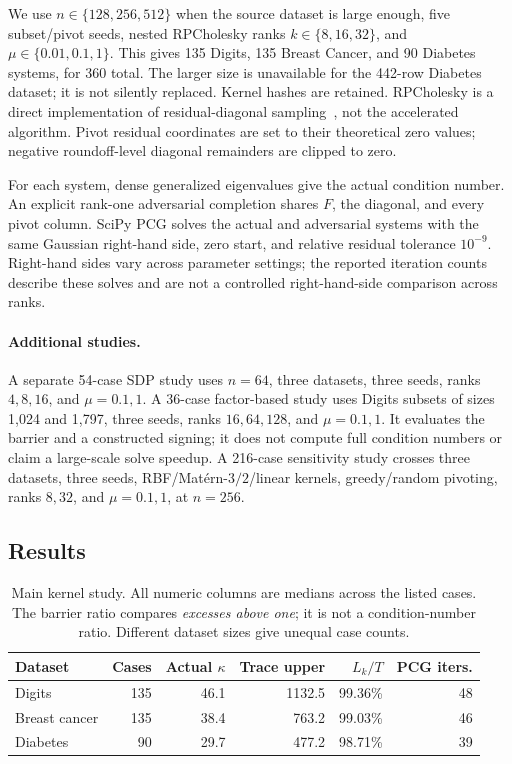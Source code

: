 \documentclass[11pt]{article}
\theoremstyle{definition}\newtheorem{definition}[theorem]{Definition}
\begin{document}
We use $n\in\{128,256,512\}$ when the source dataset is large enough, five subset/pivot seeds, nested RPCholesky ranks $k\in\{8,16,32\}$, and $\mu\in\{0.01,0.1,1\}$. This gives 135 Digits, 135 Breast Cancer, and 90 Diabetes systems, for 360 total. The larger size is unavailable for the 442-row Diabetes dataset; it is not silently replaced. Kernel hashes are retained. RPCholesky is a direct implementation of residual-diagonal sampling~\cite{chen}, not the accelerated algorithm. Pivot residual coordinates are set to their theoretical zero values; negative roundoff-level diagonal remainders are clipped to zero.

For each system, dense generalized eigenvalues give the actual condition number. An explicit rank-one adversarial completion shares $F$, the diagonal, and every pivot column. SciPy PCG solves the actual and adversarial systems with the same Gaussian right-hand side, zero start, and relative residual tolerance $10^{-9}$. Right-hand sides vary across parameter settings; the reported iteration counts describe these solves and are not a controlled right-hand-side comparison across ranks.

\paragraph{Additional studies.}
A separate 54-case SDP study uses $n=64$, three datasets, three seeds, ranks $4,8,16$, and $\mu=0.1,1$. A 36-case factor-based study uses Digits subsets of sizes 1,024 and 1,797, three seeds, ranks $16,64,128$, and $\mu=0.1,1$. It evaluates the barrier and a constructed signing; it does not compute full condition numbers or claim a large-scale solve speedup. A 216-case sensitivity study crosses three datasets, three seeds, RBF/Mat\'ern-$3/2$/linear kernels, greedy/random pivoting, ranks $8,32$, and $\mu=0.1,1$, at $n=256$.

\subsection{Results}
\begin{table}[t]
\centering\small
\caption{Main kernel study. All numeric columns are medians across the listed cases. The barrier ratio compares \emph{excesses above one}; it is not a condition-number ratio. Different dataset sizes give unequal case counts.}\label{tab:main}
\begin{tabular}{lrrrrr}
\toprule
Dataset & Cases & Actual $\kappa$ & Trace upper & $L_k/T$ & PCG iters.\\\midrule
Digits & 135 & 46.1 & 1132.5 & 99.36\% & 48 \\
Breast cancer & 135 & 38.4 & 763.2 & 99.03\% & 46 \\
Diabetes & 90 & 29.7 & 477.2 & 98.71\% & 39 \\

\bottomrule
\end{tabular}
\end{table}
\end{document}
